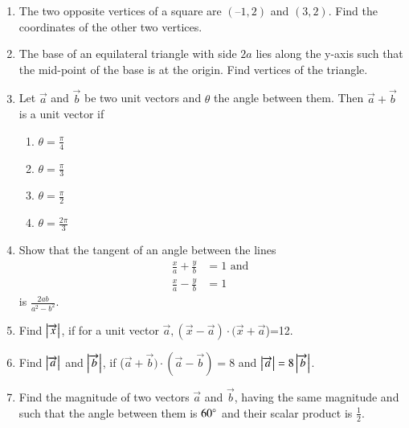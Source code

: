 \begin{enumerate}[label=\thesubsection.\arabic*,ref=\thesubsection.\theenumi]
\item The two opposite vertices of a square are $(–1, 2)$  and $ (3, 2)$. Find the coordinates of the other two vertices.
\\
\solution
	
\item The base of an equilateral triangle with side $2a$ lies along the y-axis such that the mid-point of the base is at the origin. Find vertices of the triangle.
\label{chapters/11/10/1/2}
	\\
	\solution 

\item Let $\vec{a}$ and $\vec{b}$ be two unit vectors and $\theta$ the angle between them. Then $\vec{a}+\vec{b}$ is a unit vector if
	\begin{enumerate}
			\itemsep2pt
		\item $\theta = \frac{\pi}{4}$
		\item $\theta = \frac{\pi}{3}$
		\item $\theta = \frac{\pi}{2}$
		\item $\theta = \frac{2\pi}{3}$
			\end{enumerate}
\solution

\item Show that the tangent of an angle between the lines 
\begin{align}
	\frac{x}{a}+\frac{y}{b}&=1 \text{ and }
	\\
	\frac{x}{a}-\frac{y}{b}&=1 
\end{align}
is $\frac{2ab}{a^2-b^2}$.
\item Find $\left\vert\overrightarrow {x}\right\vert$, if for a unit vector $\overrightarrow {a}, (\overrightarrow {x}-\overrightarrow {a})\cdot (\overrightarrow {x}+\overrightarrow {a}$)=12.
	\\
\solution 
		
\item Find $\left\vert\overrightarrow {a}\right\vert$ and $\left\vert\overrightarrow {b}\right\vert$, if ($\overrightarrow {a}+\overrightarrow {b})\cdot (\overrightarrow {a}-\overrightarrow {b})=8$ and $\left\vert\overrightarrow {a}\right\vert=8\left\vert\overrightarrow {b}\right\vert$.
	\\
	\solution
		
\item Find the magnitude of two vectors $\overrightarrow {a}$ and $\overrightarrow {b}$, having the same magnitude and such that the angle between them is $60\degree$ and their scalar product is $\frac{1}{2}$.

\end{enumerate}
